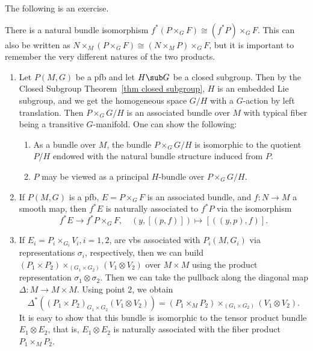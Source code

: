 The following is an exercise.
\begin{prop}\label{prop 1.2.8 RS2}
    There is a natural bundle isomorphism $f^\ast (P\times_G F)\cong (f^\ast P)\times_G F$. This can also be written as $N\times_M (P\times_G F)\cong (N\times_M P)\times_G F$, but it is important to remember the very different natures of the two products.
\end{prop}



\begin{example}\label{ex 1.2.4 RS2}
    \begin{enumerate}
        \item Let $P(M,G)$ be a \gls{pfb} and let $H\sub G$ be a closed subgroup. Then by the Closed Subgroup Theorem~\ref{thm closed subgroup}, $H$ is an embedded Lie subgroup, and we get the homogeneous space $G\slash H$ with a $G$-action by left translation. Then $P\times_G G\slash H$ is an associated bundle over $M$ with typical fiber being a transitive $G$-manifold. One can show the following:
        \begin{enumerate}
            \item As a bundle over $M$, the bundle $P\times_G G\slash H$ is isomorphic to the quotient $P\slash H$ endowed with the natural bundle structure induced from $P$.
            \item $P$ may be viewed as a principal $H$-bundle over $P\times_G G\slash H$.
        \end{enumerate}
        \item If $P(M,G)$ is a \gls{pfb}, $E=P\times_G F$ is an associated bundle, and $f:N\to M$ a smooth map, then $f^\ast E$ is naturally associated to $f^\ast P$ via the isomorphism
        \[f^\ast E\to f^\ast P\times_G F,\quad (y,[(p,f)])\mapsto [((y,p),f)].\label{eq 1.2.6 RS2}\]
        \item If $E_i=P_i\times_{G_i}V_i,i=1,2$, are \glspl{vb} associated with $P_i(M,G_i)$ via representations $\sigma_i$, respectively, then we can build $(P_1\times P_2)\times_{(G_1\times G_2)}(V_1\otimes V_2)$ over $M\times M$ using the product representation $\sigma_1\otimes \sigma_2$. Then we can take the pullback along the diagonal map $\Delta:M\to M\times M$. Using point 2, we obtain
        \[\Delta^\ast((P_1\times P_2)_{G_1\times G_2}(V_1\otimes V_2))=(P_1\times_M P_2)\times_{(G_1\times G_2)}(V_1\otimes V_2).\]
        It is easy to show that this bundle is isomorphic to the tensor product bundle $E_1\otimes E_2$, that is, $E_1\otimes E_2$ is naturally associated with the fiber product $P_1\times_M P_2$.
    \end{enumerate}
\end{example}



